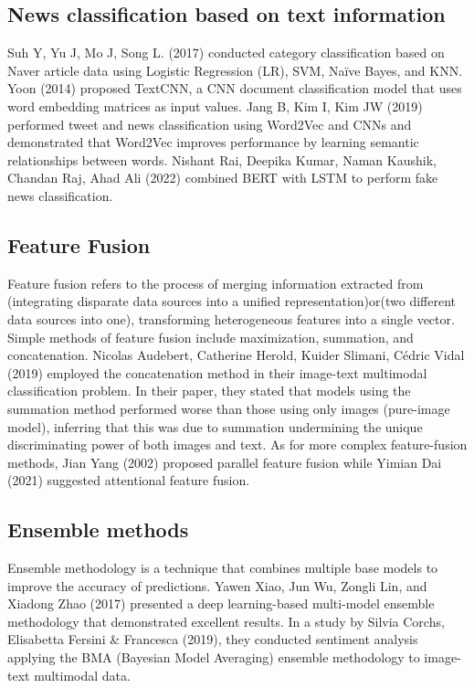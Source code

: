 \documentclass{article}
\begin{document}
\subsection{News classification based on text information}
Suh Y, Yu J, Mo J, Song L. (2017) conducted category classification based on Naver article data using Logistic Regression (LR), SVM, Naïve Bayes, and KNN. Yoon (2014) proposed TextCNN, a CNN document classification model that uses word embedding matrices as input values\cite{suh2017comparison}. Jang B, Kim I, Kim JW (2019) performed tweet and news classification using Word2Vec and CNNs and demonstrated that Word2Vec improves performance by learning semantic relationships between words\cite{jang2019word2vec}. Nishant Rai, Deepika Kumar, Naman Kaushik, Chandan Raj, Ahad Ali (2022) combined BERT with LSTM to perform fake news classification\cite{rai2022fake}.


\subsection{Feature Fusion}
Feature fusion refers to the process of merging information extracted from (integrating disparate data sources into a unified representation)or(two different data sources into one), transforming heterogeneous features into a single vector. Simple methods of feature fusion include maximization, summation, and concatenation. Nicolas Audebert, Catherine Herold, Kuider Slimani, Cédric Vidal (2019) employed the concatenation method in their image-text multimodal classification problem\cite{audebert2020multimodal}. In their paper, they stated that models using the summation method performed worse than those using only images (pure-image model), inferring that this was due to summation undermining the unique discriminating power of both images and text. As for more complex feature-fusion methods, Jian Yang (2002) proposed parallel feature fusion\cite{yang2003feature} while Yimian Dai (2021) suggested attentional feature fusion\cite{dai2021attentional}.


\subsection{Ensemble methods}
Ensemble methodology is a technique that combines multiple base models to improve the accuracy of predictions. Yawen Xiao, Jun Wu, Zongli Lin, and Xiadong Zhao (2017) presented a deep learning-based multi-model ensemble methodology that demonstrated excellent results\cite{xiao2018deep}. In a study by Silvia Corchs, Elisabetta Fersini \& Francesca (2019), they conducted sentiment analysis applying the BMA (Bayesian Model Averaging) ensemble methodology to image-text multimodal data\cite{corchs2019ensemble}.
\end{document}
